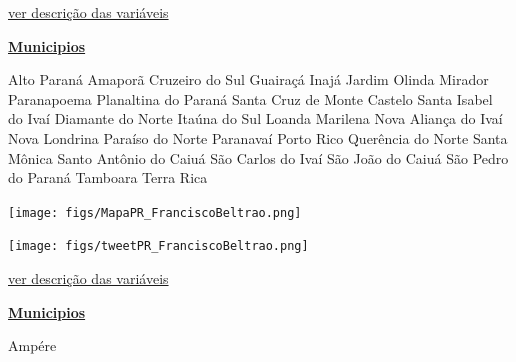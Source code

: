\documentclass[10pt]{article} %
\begin{document}
\begin{minipage}[t]{.66\linewidth}
\begin{center}

\end{center}
\small{\hyperlink{vartab}{ver descrição das variáveis}}\end{minipage}\hfill\begin{minipage}[t]{.30\linewidth}
\begin{mdframed}[style=sidebar,frametitle={}]
\textbf{\hyperlink{municips}{Municipios}}\begin{itemize}\gsquare Alto Paraná 
\gsquare Amaporã 
\gsquare Cruzeiro do Sul 
\gsquare Guairaçá 
\gsquare Inajá 
\gsquare Jardim Olinda 
\gsquare Mirador 
\gsquare Paranapoema 
\gsquare Planaltina do Paraná 
\gsquare Santa Cruz de Monte Castelo 
\gsquare Santa Isabel do Ivaí 
\gsquare Diamante do Norte 
\gsquare Itaúna do Sul 
\gsquare Loanda 
\gsquare Marilena 
\gsquare Nova Aliança do Ivaí 
\gsquare Nova Londrina 
\gsquare Paraíso do Norte 
\gsquare Paranavaí 
\gsquare Porto Rico 
\gsquare Querência do Norte 
\gsquare Santa Mônica 
\gsquare Santo Antônio do Caiuá 
\gsquare São Carlos do Ivaí 
\gsquare São João do Caiuá 
\gsquare São Pedro do Paraná 
\gsquare Tamboara 
\gsquare Terra Rica 
\end{itemize}\BackToContents\end{mdframed}\hfill\end{minipage}\newpage\begin{minipage}[t]{.66\linewidth}
\hypertarget{FrnB}{}
\texttt{[image: figs/MapaPR\_FranciscoBeltrao.png]}\vspace{0.5cm}\vspace{0.5cm}\begin{center}
\texttt{[image: figs/tweetPR\_FranciscoBeltrao.png]}\end{center}
\begin{center}

\end{center}
\small{\hyperlink{vartab}{ver descrição das variáveis}}\end{minipage}\hfill\begin{minipage}[t]{.30\linewidth}
\begin{mdframed}[style=sidebar,frametitle={}]
\textbf{\hyperlink{municips}{Municipios}}\begin{itemize}\gsquare Ampére 

\end{itemize}
\end{mdframed}
\end{minipage}
\end{document}
